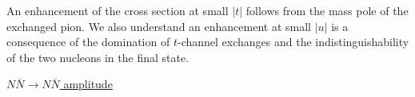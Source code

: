An enhancement of the cross section at small $|t|$ follows from the mass pole
of the exchanged pion. We also understand an enhancement at small $|u|$ is
a consequence of  the domination of $t$-channel exchanges 
and the indistinguishability of the two nucleons in the final state.


\begin{comment}
Integral expression of the scattering matrix element in Eq. (\ref{eqn:scYSelem}) 
is written in terms of the Feynman diagram as
\begin{figure}[h]
\vspace*{30mm}
\special{psfile="\feynmfdirectory/01NNtoNNeq/NNtoNN.eps" hscale=70 vscale=70 voffset=30 hoffset=70}
\label{fig:scalarYNN2NNinEq}
\end{figure}


&&
\unitlength=1mm  %
\parbox{40mm}
{
\begin{fmffile}{NNbyPi1}
	\begin{fmfgraph*}(40,20)
			\fmfleft{i1,i2}
			\fmfright{o1,o2} 
			\fmflabel{$p_b$}{i1}
			\fmflabel{$p_a$}{i2}
			\fmflabel{$p_2$}{o1}
			\fmflabel{$p_1$}{o2}
			\fmf{fermion,tension=2}{i1,v1,o1}
			\fmf{fermion,tension=2}{i2,v2,o2}
			\fmf{dashes}{v1,v2}
	\end{fmfgraph*}
\end{fmffile}
}
\hspace{3mm}
+
\hspace{3mm}
\parbox{40mm}
{
\begin{fmffile}{NNbyPi2}
	\begin{fmfgraph*}(40,20)
			\fmfleft{i1,i2}
			\fmfright{o1,o2} 
			\fmflabel{$p_b$}{i1}
			\fmflabel{$p_a$}{i2}
			\fmflabel{$p_1$}{o1}
			\fmflabel{$p_2$}{o2}
			\fmf{fermion,tension=2}{i1,v1,o1}
			\fmf{fermion,tension=2}{i2,v2,o2}
			\fmf{dashes}{v1,v2}
	\end{fmfgraph*}
\end{fmffile}
}
\end{comment}

\bigskip

\bigskip
\noindent
\underline{$N\overline{N} \to N\overline{N}$ amplitude}

